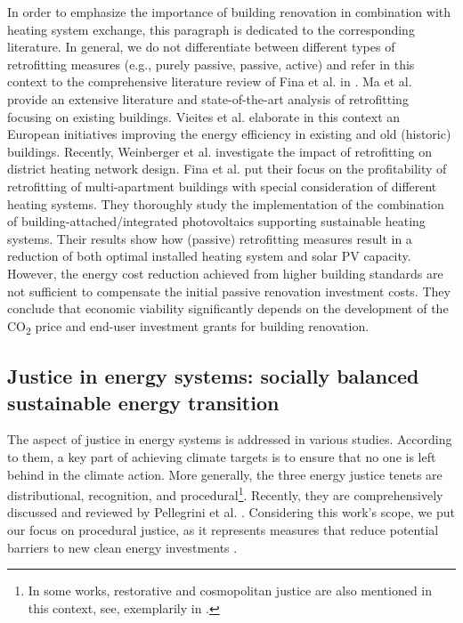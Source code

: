 In order to emphasize the importance of building renovation in combination with heating system exchange, this paragraph is dedicated to the corresponding literature. In general, we do not differentiate between different types of retrofitting measures (e.g., purely passive, passive, active) and refer in this context to the comprehensive literature review of Fina et al. in \cite{fina2019profitability}. Ma et al. \cite{ma2012existing} provide an extensive literature and state-of-the-art analysis of retrofitting focusing on existing buildings. Vieites et al. \cite{vieites2015european} elaborate in this context an European initiatives improving  the energy efficiency in existing and old (historic) buildings. Recently, Weinberger et al. \cite{weinberger2021investigating} investigate the impact of retrofitting on district heating network design. Fina et al. \cite{fina2019profitability} put their focus on the profitability of retrofitting of multi-apartment buildings with special consideration of different heating systems. They thoroughly study the implementation of the combination of building-attached/integrated photovoltaics supporting sustainable heating systems. Their results show how (passive) retrofitting measures result in a reduction of both optimal installed heating system and solar PV capacity. However, the energy cost reduction achieved from higher building standards are not sufficient to compensate the initial passive renovation investment costs. They conclude that economic viability significantly depends on the development of the CO\textsubscript{2} price and end-user investment grants for building renovation.

\subsection{Justice in energy systems: socially balanced sustainable energy transition}\label{aspect2}
The aspect of justice in energy systems is addressed in various studies. According to them, a key part of achieving climate targets is to ensure that no one is left behind in the climate action. More generally, the three energy justice tenets are distributional, recognition, and procedural\footnote{In some works, restorative and cosmopolitan justice are also mentioned in this context, see, exemplarily in \cite{oxfordjustice2021}.}. Recently, they are comprehensively discussed and reviewed by Pellegrini et al. \cite{pellegrini2020energy}. Considering this work's scope, we put our focus on procedural justice, as it represents measures that reduce potential barriers to new clean energy investments \cite{oxfordjustice2021}.\vspace{0.5cm}

